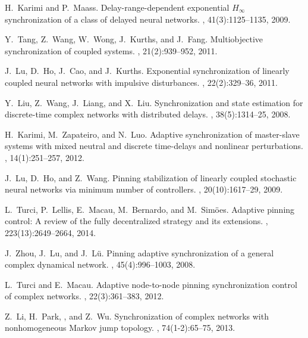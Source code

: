 \begin{thebibliography}{99}
H.~Karimi and P.~Maass.
\newblock Delay-range-dependent exponential {$H_\infty$} synchronization of a
  class of delayed neural networks.
, 41(3):1125--1135, 2009.

Y.~Tang, Z.~Wang, W.~Wong, J.~Kurths, and J.~Fang.
\newblock Multiobjective synchronization of coupled systems.
, 21(2):939--952, 2011.

J.~Lu, D.~Ho, J.~Cao, and J.~Kurths.
\newblock Exponential synchronization of linearly coupled neural networks with
  impulsive disturbances.
, 22(2):329--36, 2011.

Y.~Liu, Z.~Wang, J.~Liang, and X.~Liu.
\newblock Synchronization and state estimation for discrete-time complex
  networks with distributed delays.
, 38(5):1314--25, 2008.

H.~Karimi, M.~Zapateiro, and N.~Luo.
\newblock Adaptive synchronization of master-slave systems with mixed neutral
  and discrete time-delays and nonlinear perturbations.
, 14(1):251--257, 2012.

J.~Lu, D.~Ho, and Z.~Wang.
\newblock Pinning stabilization of linearly coupled stochastic neural networks
  via minimum number of controllers.
, 20(10):1617--29, 2009.

L.~Turci, P.~Lellis, E.~Macau, M.~Bernardo, and M.~Sim{\"{o}}es.
\newblock Adaptive pinning control: A review of the fully decentralized
  strategy and its extensions.
, 223(13):2649--2664,
  2014.

J.~Zhou, J.~Lu, and J.~L{\"{u}}.
\newblock Pinning adaptive synchronization of a general complex dynamical
  network.
, 45(4):996--1003, 2008.

L.~Turci and E.~Macau.
\newblock Adaptive node-to-node pinning synchronization control of complex
  networks.
, 22(3):361--383, 2012.

Z.~Li, H.~Park, , and Z.~Wu.
\newblock Synchronization of complex networks with nonhomogeneous {M}arkov jump
  topology.
, 74(1-2):65--75, 2013.


\end{thebibliography}

